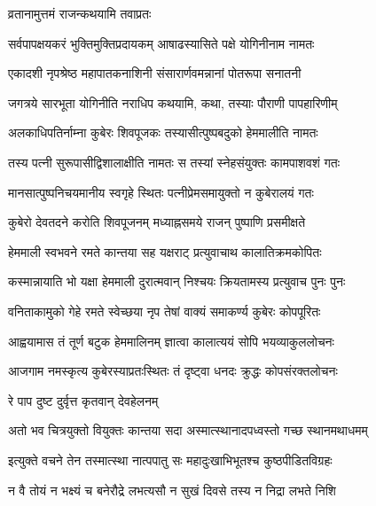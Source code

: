 

\onelineshloka
{व्रतानामुत्तमं राजन्कथयामि तवाप्रतः} %

\twolineshloka
{सर्वपापक्षयकरं भुक्तिमुक्तिप्रदायकम्}
{आषाढस्यासिते पक्षे योगिनीनाम नामतः} %

\twolineshloka
{एकादशी नृपश्रेष्ठ महापातकनाशिनी}
{संसारार्णवमन्नानां पोतरूपा सनातनी} %

\twolineshloka
{जगत्रये सारभूता योगिनीति नराधिप}
{कथयामि, कथा, तस्याः पौराणी पापहारिणीम्} %

\twolineshloka
{अलकाधिपतिर्नाम्ना कुबेरः शिवपूजकः}
{तस्यासीत्पुष्पबदुको हेममालीति नामतः} %

\twolineshloka
{तस्य पत्नी सुरूपासीद्विशालाक्षीति नामतः}
{स तस्यां स्नेहसंयुक्तः कामपाशवशं गतः} %

\twolineshloka
{मानसात्पुष्पनिचयमानीय स्वगृहे स्थितः}
{पत्नीप्रेमसमायुक्तो न कुबेरालयं गतः} %

\twolineshloka
{कुबेरो देवतदने करोति शिवपूजनम्}
{मध्याह्नसमये राजन् पुष्पाणि प्रसमीक्षते} %

\twolineshloka
{हेममाली स्वभवने रमते कान्तया सह}
{यक्षराट् प्रत्युवाचाथ कालातिक्रमकोपितः} %

\twolineshloka
{कस्मान्नायाति भो यक्षा हेममाली दुरात्मवान्}
{निश्चयः क्रियतामस्य प्रत्युवाच पुनः पुनः} %


\twolineshloka
{वनिताकामुको गेहे रमते स्वेच्छया नृप}
{तेषां वाक्यं समाकर्ण्य कुबेरः कोपपूरितः} %

\twolineshloka
{आह्वयामास तं तूर्ण बटुक हेममालिनम्}
{ज्ञात्वा कालात्ययं सोपि भयव्याकुललोचनः} %

\twolineshloka
{आजगाम नमस्कृत्य कुबेरस्याप्रतःस्थितः}
{तं दृष्ट्वा धनदः क्रुद्धः कोपसंरक्तलोचनः} %



\onelineshloka
{रे पाप दुष्ट दुर्वृत्त कृतवान् देवहेलनम्} %

\twolineshloka
{अतो भव चित्रयुक्तो वियुक्तः कान्तया सदा}
{अस्मात्स्थानादपध्वस्तो गच्छ स्थानमथाधमम्} %

\twolineshloka
{इत्युक्ते वचने तेन तस्मात्स्था नात्पपातु सः}
{महादुःखाभिभूतश्च कुष्ठपीडितविग्रहः} %

\twolineshloka
{न वै तोयं न भक्ष्यं च बनेरौद्रे लभत्यसौ}
{न सुखं दिवसे तस्य न निद्रा लभते निशि} %

